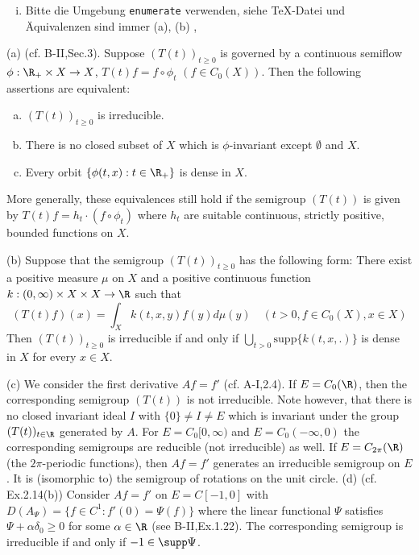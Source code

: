 \begin{examples}\label{ex:b3-3.4}
	
\begin{enumerate}[(i), wide]
\item
Bitte die Umgebung \texttt{enumerate} verwenden, siehe \TeX{}-Datei und Äquivalenzen sind immer (a), (b) ,
\end{enumerate}
\bigskip
	(a) (cf. B-II,Sec.3). Suppose $(T(t))_{t\geq 0}$ is governed by a continuous semiflow $\phi : \R_{+} \times X \to X$, \ie $T(t)f = f\circ\phi_{t}$ $(f\in C_{0}(X))$.
	Then the following assertions are equivalent:
	\begin{enumerate}[(a)]
		\item 
		$(T(t))_{t\geq 0}$ is irreducible.
	
		\item There is no closed subset of $X$ which is $\phi$-invariant except $\emptyset$ and $X$.
	
		\item 
		Every orbit $\{\phi(t,x) : t \in \R_{+}\}$ is dense in $X$.
	\end{enumerate}
	More generally, these equivalences still hold if the semigroup $(T(t))$ is given by $T(t)f = h_{t}\cdot(f\circ\phi_{t})$ where $h_{t}$ are suitable continuous, strictly positive, bounded functions on $X$.
	
	(b) Suppose that the semigroup $(T(t))_{t\geq 0}$ has the following form: There exist a positive measure $\mu$ on $X$ and a positive continuous function $k : (0,\infty) \times X \times X \to \R$ such that
	\begin{equation}
	(T(t)f)(x) = \int_{X} k(t,x,y)f(y) d\mu(y) \quad (t > 0, f \in C_{0}(X), x \in X)		
	\end{equation}	
	Then $(T(t))_{t\geq 0}$ is irreducible if and only if $\bigcup_{t>0}\text{supp}\{k(t,x,.)\}$ is dense in $X$ for every $x \in X$.
	
	(c) We consider the first derivative $Af = f'$ (cf. A-I,2.4). If $E = C_{0}(\R)$, then the corresponding semigroup $(T(t))$ is not irreducible.
	Note however, that there is no closed invariant ideal $I$ with $\{0\} \neq I \neq E$ which is invariant under the group $(T(t))_{t\in\R}$ generated by $A$.
	For $E = C_{0}[0,\infty)$ and $E = C_{0}(-\infty,0)$ the corresponding semigroups are reducible (\ie not irreducible) as well.
	If $E = C_{2\pi}(\R)$ (\ie the $2\pi$-periodic functions), then $Af = f'$ generates an irreducible semigroup on $E$.
	It is (isomorphic to) the semigroup of rotations on the unit circle.
%
%
%
%
%
	(d) (cf. Ex.2.14(b)) Consider $Af = f'$ on $E = C[-1,0]$ with $D(A_{\Psi}) = \{f \in C^1 : f'(0) = \Psi(f)\}$ where the linear functional $\Psi$ satisfies $\Psi + \alpha\delta_{0} \geq 0$ for some $\alpha \in \R$ (see B-II,Ex.1.22).
	The corresponding semigroup is irreducible if and only if $-1 \in \supp\Psi$.
	

\end{examples}
